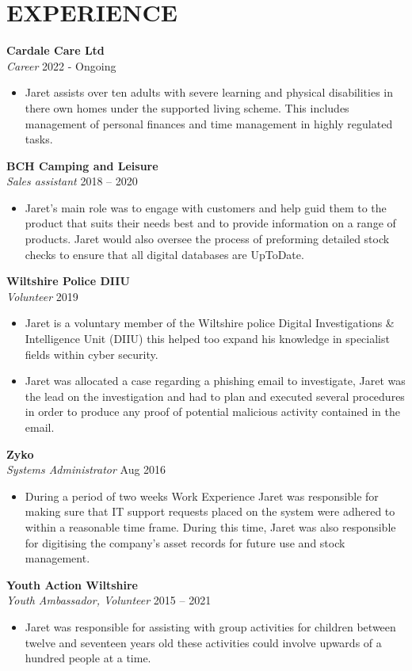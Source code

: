 \section*{EXPERIENCE}

\noindent
\textbf{Cardale Care Ltd}\\
\textit{Career} \hfill 2022 - Ongoing
\begin{itemize}
    \item Jaret assists over ten adults with severe learning and physical disabilities in there own homes under the supported living scheme. This includes management of personal finances and time management in highly regulated tasks.
\end{itemize}

\noindent
\textbf{BCH Camping and Leisure}\\
\textit{Sales assistant} \hfill 2018 – 2020
\begin{itemize}
    \item Jaret’s main role was to engage with customers and help guid them to the product that suits their needs best and to provide information on a range of products. Jaret would also oversee the process of preforming detailed stock checks to ensure that all digital databases are UpToDate. 
\end{itemize}

\noindent
\textbf{Wiltshire Police DIIU}\\
\textit{Volunteer} \hfill 2019
\begin{itemize}
    \item Jaret is a voluntary member of the Wiltshire police Digital Investigations \& Intelligence Unit (DIIU) this helped too expand his knowledge in specialist fields within cyber security.
    \item Jaret was allocated a case regarding a phishing email to investigate, Jaret was the lead on the investigation and had to plan and executed several procedures in order to produce any proof of potential malicious activity contained in the email.
\end{itemize}

\noindent
\textbf{Zyko}\\
\textit{Systems Administrator} \hfill Aug 2016
\begin{itemize}
    \item During a period of two weeks Work Experience Jaret was responsible for making sure that IT support requests placed on the system were adhered to within a reasonable time frame. During this time, Jaret was also responsible for digitising the company’s asset records for future use and stock management.
\end{itemize}


\noindent
\textbf{Youth Action Wiltshire}\\
\textit{Youth Ambassador, Volunteer} \hfill 2015 – 2021
\begin{itemize}
    \item Jaret was responsible for assisting with group activities for children between twelve and seventeen years old these activities could involve upwards of a hundred people at a time.
\end{itemize}

